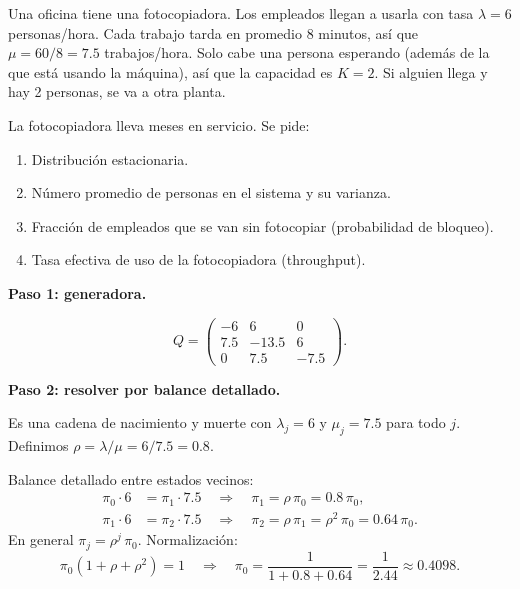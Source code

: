 \documentclass[11pt,a4paper]{article}
\theoremstyle{definition}
\theoremstyle{remark}
\begin{document}
\begin{ejemplo}
Una oficina tiene una fotocopiadora.  Los empleados llegan a usarla
con tasa $\lambda = 6$ personas/hora.  Cada trabajo tarda en promedio
8 minutos, así que $\mu = 60/8 = 7.5$ trabajos/hora.  Solo cabe una
persona esperando (además de la que está usando la máquina), así que
la capacidad es $K=2$.  Si alguien llega y hay 2 personas, se va a
otra planta.

La fotocopiadora lleva meses en servicio.  Se pide:

\begin{enumerate}[label=(\alph*)]
  \item Distribución estacionaria.
  \item Número promedio de personas en el sistema y su varianza.
  \item Fracción de empleados que se van sin fotocopiar (probabilidad de
        bloqueo).
  \item Tasa efectiva de uso de la fotocopiadora (throughput).
\end{enumerate}

\tcblower

\textbf{Paso 1: generadora.}

\begin{center}
\end{center}

\[
  Q = \begin{pmatrix}
    -6 & 6 & 0 \\
    7.5 & -13.5 & 6 \\
    0 & 7.5 & -7.5
  \end{pmatrix}.
\]

\textbf{Paso 2: resolver por balance detallado.}

Es una cadena de nacimiento y muerte con $\lambda_j = 6$ y $\mu_j = 7.5$
para todo $j$.  Definimos $\rho = \lambda/\mu = 6/7.5 = 0.8$.

Balance detallado entre estados vecinos:
\begin{align*}
  \pi_0 \cdot 6 &= \pi_1 \cdot 7.5
  \quad\Longrightarrow\quad \pi_1 = \rho\,\pi_0 = 0.8\,\pi_0, \\
  \pi_1 \cdot 6 &= \pi_2 \cdot 7.5
  \quad\Longrightarrow\quad \pi_2 = \rho\,\pi_1 = \rho^2\,\pi_0 = 0.64\,\pi_0.
\end{align*}
En general $\pi_j = \rho^j\,\pi_0$.  Normalización:
\[
  \pi_0(1 + \rho + \rho^2) = 1
  \quad\Longrightarrow\quad
  \pi_0 = \frac{1}{1+0.8+0.64} = \frac{1}{2.44} \approx 0.4098.
\]


\end{ejemplo}
\end{document}
